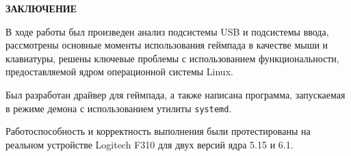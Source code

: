 \begin{center}
    {\bfseries\Large ЗАКЛЮЧЕНИЕ}
\end{center}

В ходе работы был произведен анализ подсистемы USB и подсистемы ввода, рассмотрены основные моменты использования геймпада в качестве мыши и клавиатуры, решены ключевые проблемы с использованием функциональности, предоставляемой ядром операционной системы Linux.

Был разработан драйвер для геймпада, а также написана программа, запускаемая в режиме демона с использованием утилиты \texttt{systemd}.

Работоспособность и корректность выполнения были протестированы на реальном устройстве Logitech F310 для двух версий ядра 5.15 и 6.1.

\pagebreak
